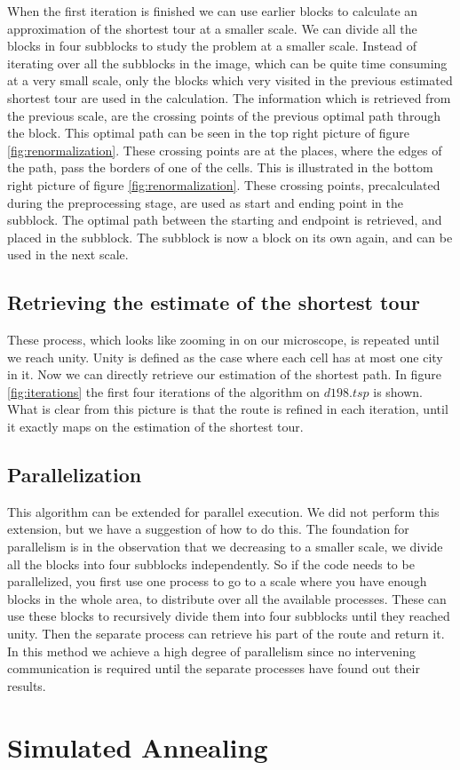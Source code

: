 When the first iteration is finished we can use earlier blocks to calculate an approximation of the shortest tour at a smaller scale. We can divide all the blocks in four subblocks to study the problem at a smaller scale. Instead of iterating over all the subblocks in the image, which can be quite time consuming at a very small scale, only the blocks which very visited in the previous estimated shortest tour are used in the calculation.
\newline\newline\noindent
The information which is retrieved from the previous scale, are the crossing points of the previous optimal path through the block. This optimal path can be seen in the top right picture of figure \ref{fig:renormalization}.  These crossing points are at the places, where the edges of the path, pass the borders of one of the cells. This is illustrated in the bottom right picture of figure \ref{fig:renormalization}. These crossing points, precalculated during the preprocessing stage, are used as start and ending point in the subblock. The optimal path between the starting and endpoint is retrieved, and placed in the subblock. The subblock is now a block on its own again, and can be used in the next scale.
\subsection{Retrieving the estimate of the shortest tour}
These process, which looks like zooming in on our microscope, is repeated until we reach unity. Unity is defined as the case where each cell has at most one city in it. Now we can directly retrieve our estimation of the shortest path. In figure \ref{fig:iterations} the first four iterations of the algorithm on $d198.tsp$ is shown. What is clear from this picture is that the route is refined in each iteration, until it exactly maps on the estimation  of the shortest tour.
\subsection{Parallelization}
This algorithm can be extended for parallel execution. We did not perform this extension, but we have a suggestion of how to do this. The foundation for parallelism is in the observation that we decreasing to a smaller scale, we divide all the blocks into four subblocks independently. So if the code needs to be parallelized, you first use one process to go to a scale where you have enough blocks in the whole area, to distribute over all the available processes. These can use these blocks to recursively divide them into four subblocks until they reached unity. Then the separate process can retrieve his part of the route and return it. In this method we achieve a high degree of parallelism since no intervening communication is required until the separate processes have found out their results. 
\section{Simulated Annealing}


